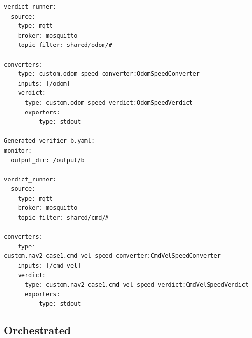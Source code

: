 \documentclass[11pt]{article}
\begin{document}
\begin{verbatim}
verdict_runner:
  source:
    type: mqtt
    broker: mosquitto
    topic_filter: shared/odom/#

converters:
  - type: custom.odom_speed_converter:OdomSpeedConverter
    inputs: [/odom]
    verdict:
      type: custom.odom_speed_verdict:OdomSpeedVerdict
      exporters:
        - type: stdout

Generated verifier_b.yaml:
monitor:
  output_dir: /output/b

verdict_runner:
  source:
    type: mqtt
    broker: mosquitto
    topic_filter: shared/cmd/#

converters:
  - type: custom.nav2_case1.cmd_vel_speed_converter:CmdVelSpeedConverter
    inputs: [/cmd_vel]
    verdict:
      type: custom.nav2_case1.cmd_vel_speed_verdict:CmdVelSpeedVerdict
      exporters:
        - type: stdout
\end{verbatim}

\subsection{Orchestrated}
\end{document}
